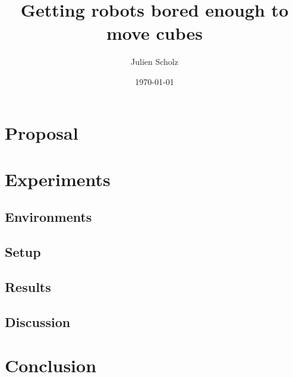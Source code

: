 \documentclass{article}
\title{Getting robots bored enough to move cubes}
\author{Julien Scholz}
\date{\today}
\begin{document}



\tableofcontents




\section{Proposal}

\section{Experiments}
\subsection{Environments}
\subsection{Setup}
\subsection{Results}
\subsection{Discussion}

\section{Conclusion}



\end{document}
